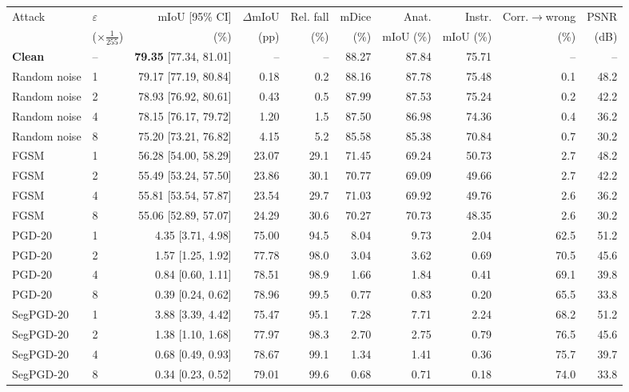 \begin{tabular}{@{}llrrrrrrrr@{}}
\toprule
Attack & $\varepsilon$ & mIoU [95\% CI] & $\Delta$mIoU & Rel. fall & mDice & Anat. & Instr. & Corr.$\to$wrong & PSNR \\
 & ($\times\frac{1}{255}$) & (\%) & (pp) & (\%) & (\%) & mIoU (\%) & mIoU (\%) & (\%) & (dB) \\
\midrule
\textbf{Clean} & -- & \textbf{79.35} [77.34, 81.01] & -- & -- & 88.27 & 87.84 & 75.71 & -- & -- \\
\addlinespace[2pt]
Random noise & 1 & 79.17 [77.19, 80.84] & 0.18 & 0.2 & 88.16 & 87.78 & 75.48 & 0.1 & 48.2 \\
Random noise & 2 & 78.93 [76.92, 80.61] & 0.43 & 0.5 & 87.99 & 87.53 & 75.24 & 0.2 & 42.2 \\
Random noise & 4 & 78.15 [76.17, 79.72] & 1.20 & 1.5 & 87.50 & 86.98 & 74.36 & 0.4 & 36.2 \\
Random noise & 8 & 75.20 [73.21, 76.82] & 4.15 & 5.2 & 85.58 & 85.38 & 70.84 & 0.7 & 30.2 \\
\addlinespace[2pt]
FGSM & 1 & 56.28 [54.00, 58.29] & 23.07 & 29.1 & 71.45 & 69.24 & 50.73 & 2.7 & 48.2 \\
FGSM & 2 & 55.49 [53.24, 57.50] & 23.86 & 30.1 & 70.77 & 69.09 & 49.66 & 2.7 & 42.2 \\
FGSM & 4 & 55.81 [53.54, 57.87] & 23.54 & 29.7 & 71.03 & 69.92 & 49.76 & 2.6 & 36.2 \\
FGSM & 8 & 55.06 [52.89, 57.07] & 24.29 & 30.6 & 70.27 & 70.73 & 48.35 & 2.6 & 30.2 \\
\addlinespace[2pt]
PGD-20 & 1 & 4.35 [3.71, 4.98] & 75.00 & 94.5 & 8.04 & 9.73 & 2.04 & 62.5 & 51.2 \\
PGD-20 & 2 & 1.57 [1.25, 1.92] & 77.78 & 98.0 & 3.04 & 3.62 & 0.69 & 70.5 & 45.6 \\
PGD-20 & 4 & 0.84 [0.60, 1.11] & 78.51 & 98.9 & 1.66 & 1.84 & 0.41 & 69.1 & 39.8 \\
PGD-20 & 8 & 0.39 [0.24, 0.62] & 78.96 & 99.5 & 0.77 & 0.83 & 0.20 & 65.5 & 33.8 \\
\addlinespace[2pt]
SegPGD-20 & 1 & 3.88 [3.39, 4.42] & 75.47 & 95.1 & 7.28 & 7.71 & 2.24 & 68.2 & 51.2 \\
SegPGD-20 & 2 & 1.38 [1.10, 1.68] & 77.97 & 98.3 & 2.70 & 2.75 & 0.79 & 76.5 & 45.6 \\
SegPGD-20 & 4 & 0.68 [0.49, 0.93] & 78.67 & 99.1 & 1.34 & 1.41 & 0.36 & 75.7 & 39.7 \\
SegPGD-20 & 8 & 0.34 [0.23, 0.52] & 79.01 & 99.6 & 0.68 & 0.71 & 0.18 & 74.0 & 33.8 \\
\bottomrule
\end{tabular}
